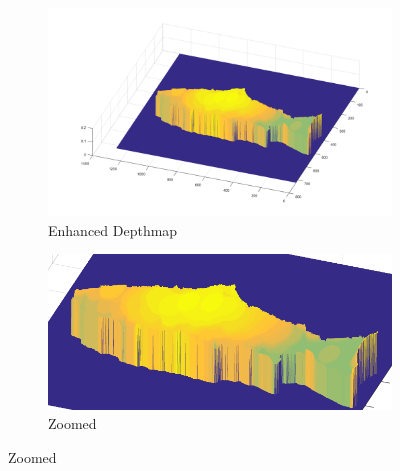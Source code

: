 \begin{figure}[H]
    \medskip
    \begin{subfigure}{0.41\textwidth}
        \includegraphics[width=\linewidth]{images/results/3D_plots/fixed_3D_63}
        \caption{Enhanced Depthmap}
    \end{subfigure}\hspace*{\fill}
    \begin{subfigure}{0.57\textwidth}
        \includegraphics[width=\linewidth]{images/results/3D_plots/zoomed_fixed_3D_63}
        \caption{Zoomed}
    \end{subfigure}
    

\end{figure}
